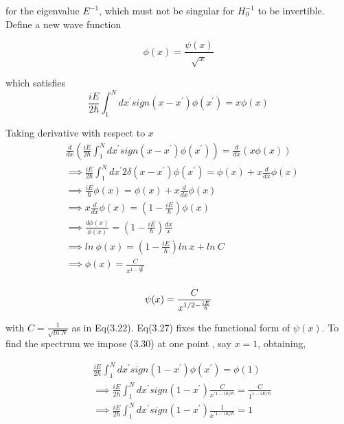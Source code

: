 \documentclass[12pt]{report}
\newcommand*{\1}{\hspace{1pt}}
\begin{document}
        for the eigenvalue $E^{-1}$, which must not be singular for $H_{0}^{-1}$ to be invertible. Define a new wave function 
    
        \begin{equation}
            \phi (x) = \frac{\psi (x)}{\sqrt{x}}
        \end{equation}

        which satisfies 
        \begin{equation}
            \frac{iE}{2\hbar} \int _{1}^{N} dx^{'}sign(x-x^{'})\phi(x^{'})= x\phi(x)
        \end{equation}

        Taking derivative with respect to $x$
        \begin{equation}
            \begin{split}
                &\frac{d}{dx}\left(\frac{iE}{2\hbar} \int _{1}^{N} dx^{'}sign(x-x^{'})\phi(x^{'})\right)= \frac{d}{dx}\left( x\phi(x) \right) \\ 
                &\implies \frac{iE}{2\hbar} \int _{1}^{N} dx^{'}2\delta(x-x^{'})\phi(x^{'}) = \phi(x) + x \frac{d}{dx} \phi(x)  \\
                &\implies \frac{iE}{\hbar} \phi(x) = \phi(x) + x \frac{d}{dx} \phi(x)  \\
                &\implies x \frac{d}{dx} \phi(x) = \left(1 - \frac{iE}{\hbar}\right) \phi(x)   \\
                &\implies \frac{d\phi(x)}{\phi(x)} = \left(1 - \frac{iE}{\hbar}\right) \frac{dx}{x}   \\
                &\implies ln \ \phi(x) = \left(1 - \frac{iE}{\hbar}\right) ln \ x + ln \ C   \\
                &\implies \phi(x) = \frac{C}{x^{1 - \frac{iE}{\hbar}}}    \\
            \end{split}
        \end{equation}

        \begin{equation}
            \psi(x) = \frac{C}{x^{1/2 - \frac{iE}{\hbar}}}    \\
        \end{equation}

        with $C=\frac{1}{\sqrt{ln \  N}}$ as in Eq(3.22). Eq(3.27) fixes the functional form of $\psi(x)$. To find the spectrum we impose (3.30) at one point , say $x=1$, 
        obtaining,

        \begin{equation}
            \begin{split}
                &\frac{iE}{2\hbar} \int _{1}^{N} dx^{'} sign(1-x^{'}) \phi(x^{'}) = \phi(1) \\ 
                & \implies \frac{iE}{2\hbar} \int _{1}^{N} dx^{'} sign(1-x^{'}) \frac{C}{x^{' 1 - iE/\hbar}} = \frac{C}{1^{1 - iE/\hbar}} \\
                & \implies \frac{iE}{2\hbar} \int _{1}^{N} dx^{'} sign(1-x^{'}) \frac{1}{x^{' 1 - iE/\hbar}} = 1\\
            \end{split}
        \end{equation}
\end{document}
